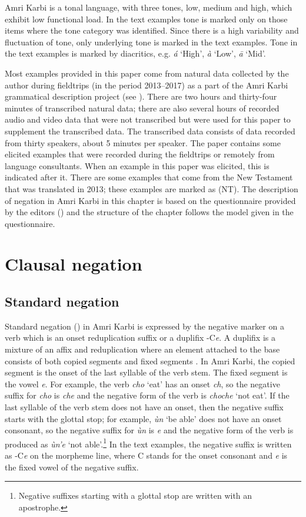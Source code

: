\documentclass[output=paper,colorlinks,citecolor=brown]{langscibook}
\begin{document}
Amri Karbi is a tonal language, with three tones, low, medium and high, which exhibit low functional load. In the text examples tone is marked only on those items where the tone category was identified. Since there is a high variability and fluctuation of tone, only underlying tone is marked in the text examples. Tone in the text examples is marked by diacritics, e.g. \textit{á} ‘High’, \textit{à} ‘Low’, \textit{ā} ‘Mid’. 

Most examples provided in this paper come from natural data collected by the author during fieldtrips (in the period 2013--2017) as a part of the Amri Karbi grammatical description project (see \citealt{Philippova2021}). There are two hours and thirty-four minutes of transcribed natural data; there are also several hours of recorded audio and video data that were not transcribed but were used for this paper to supplement the transcribed data. The transcribed data consists of data recorded from thirty speakers, about 5 minutes per speaker. The paper contains some elicited examples that were recorded during the fieldtrips or remotely from language consultants. When an example in this paper was elicited, this is indicated after it. There are some examples that come from the New Testament \citet{AmriNT} that was translated in 2013; these examples are marked as (NT). The description of negation in Amri Karbi in this chapter is based on the questionnaire provided by the editors () and the structure of the chapter follows the model given in the questionnaire.

\section{Clausal negation}\label{sec:amr:2}
\subsection{Standard negation}\label{sec:amr:2.1}
Standard negation (\citealt{Payne1985,Miestamo2005}) in Amri Karbi is expressed by the negative marker on a verb which is an onset reduplication suffix or a duplifix -C\textit{e}. A duplifix is a mixture of an affix and reduplication where an element attached to the base consists of both copied segments and fixed segments \citep[24]{Haspelmath2002}. In Amri Karbi, the copied segment is the onset of the last syllable of the verb stem. The fixed segment is the vowel \textit{e}. For example, the verb \textit{cho} ‘eat’ has an onset \textit{ch}, so the negative suffix for \textit{cho} is \textit{che} and the negative form of the verb is \textit{choche} ‘not eat’. If the last syllable of the verb stem does not have an onset, then the negative suffix starts with the glottal stop; for example, \textit{ùn} ‘be able’ does not have an onset consonant, so the negative suffix for \textit{ùn} is \textit{e} and the negative form of the verb is produced as \textit{ùn’e} ‘not able’.\footnote{Negative suffixes starting with a glottal stop are written with an apostrophe.} In the text examples, the negative suffix is written as -C\textit{e} on the morpheme line, where C stands for the onset consonant and \textit{e} is the fixed vowel of the negative suffix.
\end{document}

